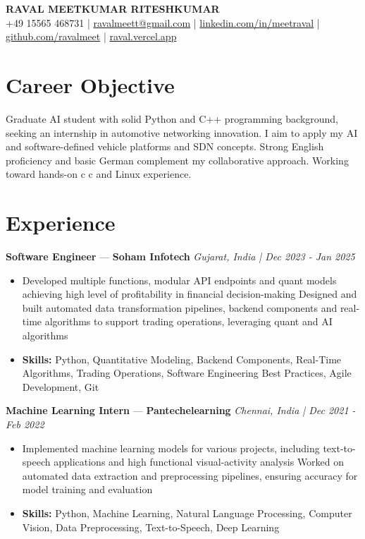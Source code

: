 \documentclass[a4paper,10pt]{article}
\begin{document}
\begin{center}
  {\Large\bfseries RAVAL MEETKUMAR RITESHKUMAR}\\[2pt]
  {\small +49 15565 468731 \;|\; \href{mailto:ravalmeett@gmail.com}{ravalmeett@gmail.com} \;|\; \href{https://www.linkedin.com/in/meetraval/}{linkedin.com/in/meetraval} \;|\; \href{https://github.com/ravalmeet}{github.com/ravalmeet} \;|\; \href{https://raval.vercel.app/}{raval.vercel.app}}
\end{center}
\vspace{-3pt}

\section*{Career Objective}
Graduate AI student with solid Python and C++ programming background, seeking an internship in automotive networking innovation. I aim to apply my AI and software-defined vehicle platforms and SDN concepts. Strong English proficiency and basic German complement my collaborative approach. Working toward hands-on c c and Linux experience.\par

\section*{Experience}
\textbf{Software Engineer} — \textbf{Soham Infotech} \hfill \textit{Gujarat, India \;|\; Dec 2023 - Jan 2025}\par
\vspace{1pt}
\begin{itemize}
  \item Developed multiple functions, modular API endpoints and quant models achieving high level of profitability in financial decision-making Designed and built automated data transformation pipelines, backend components and real-time algorithms to support trading operations, leveraging quant and AI algorithms
  \item \textbf{Skills:} Python, Quantitative Modeling, Backend Components, Real-Time Algorithms, Trading Operations, Software Engineering Best Practices, Agile Development, Git
\end{itemize}
\vspace{3pt}
\textbf{Machine Learning Intern} — \textbf{Pantechelearning} \hfill \textit{Chennai, India \;|\; Dec 2021 - Feb 2022}\par
\vspace{1pt}
\begin{itemize}
  \item Implemented machine learning models for various projects, including text-to-speech applications and high functional visual-activity analysis Worked on automated data extraction and preprocessing pipelines, ensuring accuracy for model training and evaluation
  \item \textbf{Skills:} Python, Machine Learning, Natural Language Processing, Computer Vision, Data Preprocessing, Text-to-Speech, Deep Learning
\end{itemize}
\end{document}

